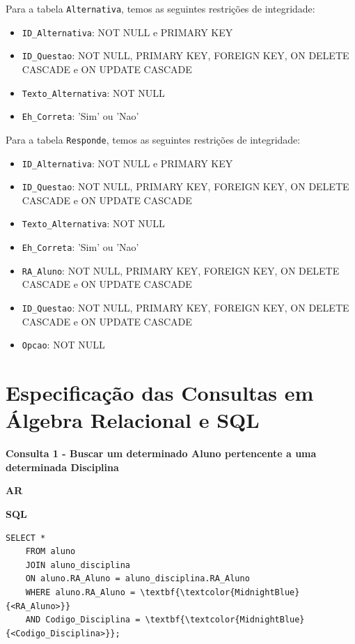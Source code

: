 \documentclass[12pt,a4paper]{article}
\begin{document}
\vspace{0.5cm}
Para a tabela \texttt{Alternativa}, temos as seguintes restrições de integridade:

\begin{itemize}
    \item \texttt{ID\_Alternativa}: NOT NULL e PRIMARY KEY
    \item \texttt{ID\_Questao}: NOT NULL, PRIMARY KEY, FOREIGN KEY, ON DELETE CASCADE e ON UPDATE CASCADE
    \item \texttt{Texto\_Alternativa}: NOT NULL
    \item \texttt{Eh\_Correta}: 'Sim' ou 'Nao'
\end{itemize}

\vspace{0.5cm}
Para a tabela \texttt{Responde}, temos as seguintes restrições de integridade:

\begin{itemize}
    \item \texttt{ID\_Alternativa}: NOT NULL e PRIMARY KEY
    \item \texttt{ID\_Questao}: NOT NULL, PRIMARY KEY, FOREIGN KEY, ON DELETE CASCADE e ON UPDATE CASCADE
    \item \texttt{Texto\_Alternativa}: NOT NULL
    \item \texttt{Eh\_Correta}: 'Sim' ou 'Nao'
\end{itemize}

\vspace{0.5cm}
\begin{itemize}
    \item \texttt{RA\_Aluno}: NOT NULL, PRIMARY KEY, FOREIGN KEY, ON DELETE CASCADE e ON UPDATE CASCADE
    \item \texttt{ID\_Questao}: NOT NULL, PRIMARY KEY, FOREIGN KEY, ON DELETE CASCADE e ON UPDATE CASCADE
    \item \texttt{Opcao}: NOT NULL
\end{itemize}
\vspace{0.5cm}
\section{Especificação das Consultas em Álgebra Relacional e SQL}
\vspace{0.5cm}

\begin{center}
    \textbf{Consulta 1 - Buscar um determinado Aluno pertencente a uma determinada Disciplina}
\end{center}
\begin{center}
    \textbf{AR}
\end{center}
\begin{center}
    \textbf{SQL}
\end{center}
\begin{Verbatim}[commandchars=\\\{\}]
    SELECT *
    FROM aluno
    JOIN aluno_disciplina
    ON aluno.RA_Aluno = aluno_disciplina.RA_Aluno
    WHERE aluno.RA_Aluno = \textbf{\textcolor{MidnightBlue}{<RA_Aluno>}}
    AND Codigo_Disciplina = \textbf{\textcolor{MidnightBlue}{<Codigo_Disciplina>}};
\end{Verbatim}
\end{document}
